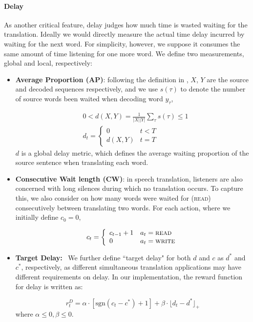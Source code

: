 \paragraph{Delay}As another critical feature, delay judges how much time is wasted waiting for the translation. Ideally we would directly measure the actual time delay incurred by waiting for the next word. For simplicity, however, we suppose it consumes the same amount of time listening  for one more word. We define two measurements, global and local, respectively:

\begin{itemize}
    \item \textbf{Average Proportion (AP)}: following the definition in \cite{cho2016can}, $X$, $Y$ are the source and decoded sequences respectively, and we use $s(\tau)$ to denote the number of source words been waited when decoding word $y_\tau$, 

    \begin{equation}
    \begin{split}
        &0 < d\left(X, Y\right) = \frac{1}{|X||Y|}\sum_{\tau}{s(\tau)}\leq 1 \\
        &d_t = 
        \left\{\begin{array}{ll}
        0    &     t < T\\
        d(X, Y)  &     t = T
        \end{array} \right. 
    \end{split}
    \end{equation}
    $d$ is a global delay metric, which defines the average waiting proportion of the source sentence when translating each word.\vspace{-5pt}
    \item \textbf{Consecutive Wait length (CW)}: in speech translation, listeners are also concerned with long silences during which no translation occurs. To capture this, we also consider on how many words were waited for (\textsc{read}) consecutively between translating two words. For each action, where we initially define $c_0=0$,

    \begin{equation}
        c_t = 
        \left\{\begin{array}{ll}
        c_{t-1} + 1    &     a_t = \textsc{read}\\
        0             &      a_t = \textsc{write}
        \end{array} \right.         
    \end{equation}
\item \textbf{Target Delay:}~
We further define ``target delay" for both $d$ and $c$ as $d^*$ and $c^*$, respectively, as different simultaneous translation applications may have different requirements on delay. In our implementation, the reward function for delay is written as:

\begin{equation}
    \label{cp9.eq.rd}
    r_t^{D} = \alpha \cdot \left[\text{sgn}(c_t - c^*)+1\right] + \beta \cdot \lfloor d_t - d^* \rfloor_{+}
\end{equation}
where $\alpha \leq 0, \beta \leq 0$. 
\end{itemize}

